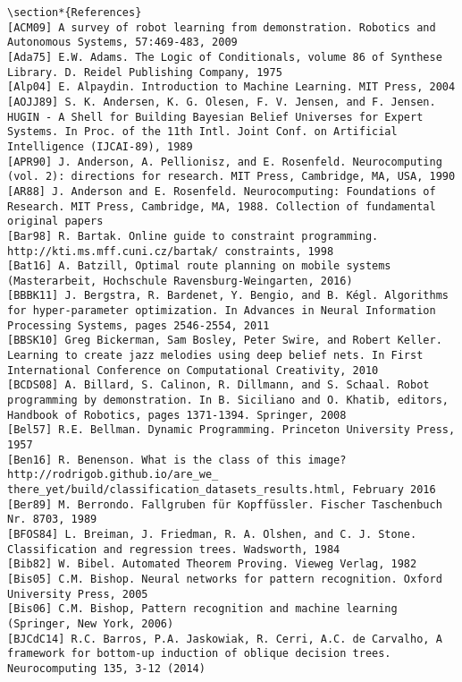 \documentclass[10pt]{article}
\begin{document}
\begin{verbatim}
\section*{References}
[ACM09] A survey of robot learning from demonstration. Robotics and Autonomous Systems, 57:469-483, 2009
[Ada75] E.W. Adams. The Logic of Conditionals, volume 86 of Synthese Library. D. Reidel Publishing Company, 1975
[Alp04] E. Alpaydin. Introduction to Machine Learning. MIT Press, 2004
[AOJJ89] S. K. Andersen, K. G. Olesen, F. V. Jensen, and F. Jensen. HUGIN - A Shell for Building Bayesian Belief Universes for Expert Systems. In Proc. of the 11th Intl. Joint Conf. on Artificial Intelligence (IJCAI-89), 1989
[APR90] J. Anderson, A. Pellionisz, and E. Rosenfeld. Neurocomputing (vol. 2): directions for research. MIT Press, Cambridge, MA, USA, 1990
[AR88] J. Anderson and E. Rosenfeld. Neurocomputing: Foundations of Research. MIT Press, Cambridge, MA, 1988. Collection of fundamental original papers
[Bar98] R. Bartak. Online guide to constraint programming. http://kti.ms.mff.cuni.cz/bartak/ constraints, 1998
[Bat16] A. Batzill, Optimal route planning on mobile systems (Masterarbeit, Hochschule Ravensburg-Weingarten, 2016)
[BBBK11] J. Bergstra, R. Bardenet, Y. Bengio, and B. Kégl. Algorithms for hyper-parameter optimization. In Advances in Neural Information Processing Systems, pages 2546-2554, 2011
[BBSK10] Greg Bickerman, Sam Bosley, Peter Swire, and Robert Keller. Learning to create jazz melodies using deep belief nets. In First International Conference on Computational Creativity, 2010
[BCDS08] A. Billard, S. Calinon, R. Dillmann, and S. Schaal. Robot programming by demonstration. In B. Siciliano and O. Khatib, editors, Handbook of Robotics, pages 1371-1394. Springer, 2008
[Bel57] R.E. Bellman. Dynamic Programming. Princeton University Press, 1957
[Ben16] R. Benenson. What is the class of this image? http://rodrigob.github.io/are_we_ there_yet/build/classification_datasets_results.html, February 2016
[Ber89] M. Berrondo. Fallgruben für Kopffüssler. Fischer Taschenbuch Nr. 8703, 1989
[BFOS84] L. Breiman, J. Friedman, R. A. Olshen, and C. J. Stone. Classification and regression trees. Wadsworth, 1984
[Bib82] W. Bibel. Automated Theorem Proving. Vieweg Verlag, 1982
[Bis05] C.M. Bishop. Neural networks for pattern recognition. Oxford University Press, 2005
[Bis06] C.M. Bishop, Pattern recognition and machine learning (Springer, New York, 2006)
[BJCdC14] R.C. Barros, P.A. Jaskowiak, R. Cerri, A.C. de Carvalho, A framework for bottom-up induction of oblique decision trees. Neurocomputing 135, 3-12 (2014)

\end{verbatim}
\end{document}
